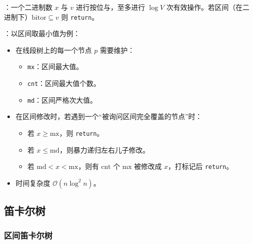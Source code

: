 ：一个二进制数 $x$ 与 $v$ 进行按位与，至多进行 $\log V$ 次有效操作。若区间（在二进制下）$\mathrm{bitor} \subseteq v$ 则 \texttt{return}。

：以区间取最小值为例：

\begin{itemize}
    \item 在线段树上的每一个节点 $p$ 需要维护：
    \begin{itemize}
        \item \texttt{mx}：区间最大值。
        \item \texttt{cnt}：区间最大值个数。
        \item \texttt{md}：区间严格次大值。
    \end{itemize}
    \item 在区间修改时，若遇到一个“被询问区间完全覆盖的节点”时：
    \begin{itemize}
        \item 若 $x \geq \mathrm{mx}$，则 \texttt{return}。
        \item 若 $x \leq \mathrm{md}$，则暴力递归左右儿子修改。
        \item 若 $\mathrm{md} < x < \mathrm{mx}$，则有 $\mathrm{cnt}$ 个 $\mathrm{mx}$ 被修改成 $x$，打标记后 \texttt{return}。
    \end{itemize}
    \item 时间复杂度 $\mathcal{O}(n \log^2 n)$。
\end{itemize}


\subsection{笛卡尔树}



\subsubsection{区间笛卡尔树}

